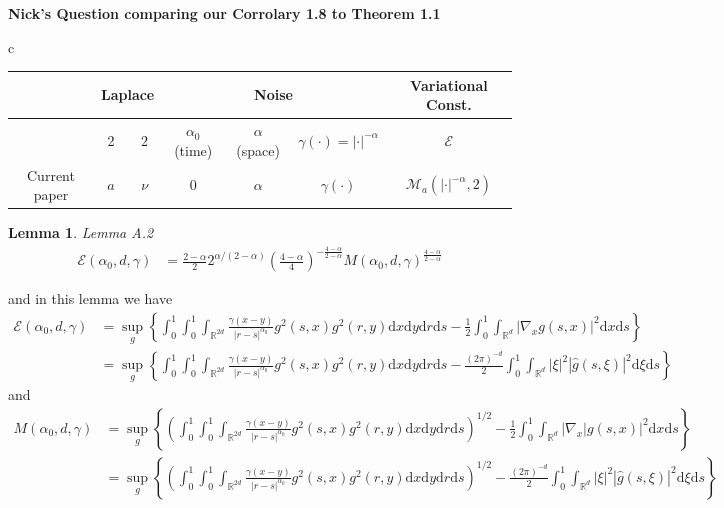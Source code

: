 \documentclass[a4paper,11pt]{article}
\numberwithin{equation}{section}
\theoremstyle{plain}
\newtheorem{lemma}[theorem]{Lemma}
\theoremstyle{definition}
\newcommand{\ud}{\ensuremath{\mathrm{d} }}
\newcommand{\R}{\mathbb{R}}
\newcounter{NQ}
\newenvironment{NickQuestion}[1][] %
{\refstepcounter{NQ}
	\begin{mdframed}[backgroundcolor=lightgray]\textbf{Nick's Question \theNQ \: #1~~}~~~\noindent}%
	{\end{mdframed}}
\numberwithin{NQ}{section}
\numberwithin{LQ}{section}
\numberwithin{ZQ}{section}
\begin{document}
\begin{NickQuestion}[comparing our Corrolary 1.8 to \cite{CHSS18} Theorem 1.1]
	\begin{tabular}{c}
	\renewcommand{\arraystretch}{1.2}
	\begin{tabular}{|c|c|c|c|c|c|c|}
		\hline
		& \multicolumn{2}{c|}{Laplace} & \multicolumn{3}{c|}{Noise}    & Variational Const.  \\ \hline
		\cite{15AIHP}  & 2                      & $2$                        &  $\alpha_0$ (time) & $\alpha$ (space) & $\gamma(\cdot)=|\cdot|^{-\alpha}$    & $\mathcal{E}$                                \\
		Current paper                 & $a$                          & $\nu$           &0&            $\alpha$ & $\gamma(\cdot)$                  & $\mathcal{M}_a\left(|\cdot|^{-\alpha},2\right)$ \\ \hline
	\end{tabular}
\end{tabular}

	\begin{lemma}
Lemma A.2 \cite{15AIHP}
		\begin{align*}
			\mathcal{E}(\alpha_0,d,\gamma) &= \frac{2-\alpha}{2}2^{\alpha/(2-\alpha)}\left( \frac{4-\alpha}{4} \right)^{-\frac{4-\alpha}{2-\alpha}}M(\alpha_0,d,\gamma)^{\frac{4-\alpha}{2-\alpha}}
		\end{align*}
	\end{lemma}
and in this lemma we have
		\begin{align*}
			\mathcal{E}(\alpha_0,d,\gamma) &= \sup_{g} \left\{ \int_0^1 \int_0^1 \int_{\R^{2d}} \frac{\gamma(x-y)}{|r-s|^{\alpha_0}}  g^2(s,x)g^2(r,y) \ud x \ud y \ud r \ud s - \frac{1}{2} \int_0^1 \int_{\R^d} |\nabla_x g(s,x)|^2 \ud x \ud s \right\}
		\\& = \sup_{g} \left\{ \int_0^1 \int_0^1 \int_{\R^{2d}} \frac{\gamma(x-y)}{|r-s|^{\alpha_0}}  g^2(s,x)g^2(r,y) \ud x \ud y \ud r \ud s - \frac{(2\pi)^{-d}}{2} \int_0^1 \int_{\R^d} |\xi|^2|\hat{g}(s,\xi)|^2 \ud \xi \ud s \right\}
		\end{align*}
and
		\begin{align*}
			M(\alpha_0,d,\gamma) &= \sup_{g} \left\{ \left( \int_0^1 \int_0^1 \int_{\R^{2d}} \frac{\gamma(x-y)}{|r-s|^{\alpha_0}} g^2(s,x) g^2(r,y) \ud x \ud y \ud r \ud s  \right)^{1/2} - \frac{1}{2} \int_0^1 \int_{\R^d} | \nabla_x |g(s,x)|^2 \ud x \ud s \right\}
			\\& = \sup_{g} \left\{ \left( \int_0^1 \int_0^1 \int_{\R^{2d}} \frac{\gamma(x-y)}{|r-s|^{\alpha_0}} g^2(s,x) g^2(r,y) \ud x \ud y \ud r \ud s  \right)^{1/2} - \frac{(2\pi)^{-d}}{2} \int_0^1 \int_{\R^d} | \xi|^2  |\hat{g}(s,\xi)|^2 \ud \xi \ud s \right\}
		\end{align*}


\end{NickQuestion}
\end{document}
